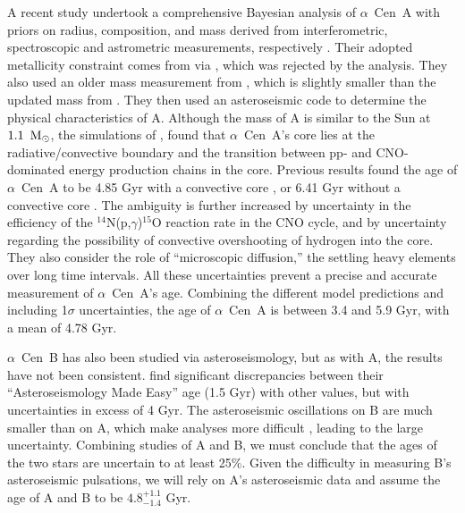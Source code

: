 \documentclass[preprint,12pt]{aastex}
\newcommand{\xxx}[1]{{\color{red} #1}} %
\newcommand{\xxx}[1]{{\color{red} #1}} %
\def\msun{{\rm\,M_\odot}}
\def\eg{{\it e.g.\ }}
\def\acen{{$\alpha$~Cen}}
\begin{document}
A recent study undertook a comprehensive Bayesian analysis of \acen~A
with priors on radius, composition, and mass derived from
interferometric, spectroscopic and astrometric measurements,
respectively \citep{Bazot16}. Their adopted metallicity constraint
comes from \cite{NeuforgeMagain97} via \cite{Thoul03}, which was
rejected by the \cite{HinkelKane13} analysis. They also used an older
mass measurement from \cite{Pourbaix02}, which is slightly smaller
than the updated mass from \cite{PourbaixBoffin16}. They then used an
asteroseismic code to determine the physical characteristics of
A. Although the mass of A is similar to the Sun at $1.1~\msun$, the
simulations of \xxx{\cite{Bazot16}}, found that \acen~A's core lies at the
radiative/convective boundary and the transition between pp- and
CNO-dominated energy production chains in the core. Previous results
found the age of \acen~A to be 4.85 Gyr with a convective core
\citep{Thevenin02}, or 6.41 Gyr without a convective core
\citep{Thoul03}. The ambiguity is further increased by uncertainty in
the efficiency of the $^{14}$N(p,$\gamma$)$^{15}$O reaction rate in
the CNO cycle, and by uncertainty regarding the possibility of
convective overshooting of hydrogen into the core. They also consider
the role of ``microscopic diffusion,'' the settling heavy
elements over long time intervals. All these uncertainties
prevent a precise and accurate measurement of \acen~A's
age. Combining the different model predictions and including 1$\sigma$
uncertainties, the age of \acen~A is between 3.4 and 5.9 Gyr,
with a mean of 4.78 Gyr.

\acen~B has also been studied via asteroseismology, but as with A, the
results have not been consistent. \cite{Lundkvist14} find significant
discrepancies between their ``Asteroseismology Made Easy'' age (1.5
Gyr) with other values, but with uncertainties in excess of 4 Gyr. The
asteroseismic oscillations on B are much smaller than on A, which make
analyses more difficult \citep[see, \eg,][]{CarrierBourban03},
leading to the large uncertainty. Combining studies of A and B, we
must conclude that the ages of the two stars are uncertain to at least
25\%. Given the difficulty in measuring B's asteroseismic pulsations,
we will rely on A's asteroseismic data and assume the age of A and B
to be $4.8^{+1.1}_{-1.4}$ Gyr.
\end{document}
